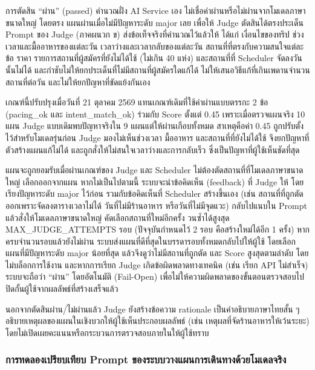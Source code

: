 การตัดสิน ``ผ่าน'' (passed) คำนวณฝั่ง AI Service เอง ไม่เชื่อค่าผ่านหรือไม่ผ่านจากโมเดลภาษาขนาดใหญ่ โดยตรง แผนผ่านเมื่อไม่มีปัญหาระดับ major เลย เพื่อให้ Judge ตัดสินได้ตรงประเด็น Prompt ของ Judge (ภาคผนวก ข) ส่งข้อเท็จจริงที่คำนวณไว้แล้วให้ ได้แก่ เงื่อนไขของทริป ช่วงเวลาและมื้ออาหารของแต่ละวัน เวลาว่างและเวลากลับของแต่ละวัน สถานที่ที่ตรงกับความสนใจแต่ละข้อ ราคา รายการสถานที่ผู้สมัครที่ยังไม่ได้ใช้ (ไม่เกิน 40 แห่ง) และสถานที่ที่ Scheduler จัดลงวันนั้นไม่ได้ และกำชับไม่ให้ยกประเด็นที่ไม่มีสถานที่ผู้สมัครใดแก้ได้ ไม่ให้เสนอวิธีแก้ที่เกินเพดานจำนวนสถานที่ต่อวัน และไม่ให้ยกปัญหาที่ขัดแย้งกันเอง

เกณฑ์นี้ปรับปรุงเมื่อวันที่ 21 ตุลาคม 2569 แทนเกณฑ์เดิมที่ใช้ค่าผ่านแบบตรรกะ 2 ข้อ (pacing\_ok และ intent\_match\_ok) ร่วมกับ Score ตั้งแต่ 0.45 เพราะเมื่อตรวจแผนจริง 10 แผน Judge แบบเดิมพบปัญหาจริงใน 9 แผนแต่ให้ผ่านเกือบทั้งหมด สาเหตุคือค่า 0.45 ถูกปรับตั้งไว้สำหรับโมเดลรุ่นก่อน Judge มองไม่เห็นช่วงเวลา มื้ออาหาร และสถานที่ที่ยังไม่ได้ใช้ จึงยกปัญหาที่ตัวสร้างแผนแก้ไม่ได้ และถูกสั่งให้ไม่สนใจเวลาว่างและการกลับเร็ว ซึ่งเป็นปัญหาที่ผู้ใช้เห็นชัดที่สุด

แผนจะถูกยอมรับเมื่อผ่านเกณฑ์ของ Judge และ Scheduler ไม่ต้องตัดสถานที่ที่โมเดลภาษาขนาดใหญ่ เลือกออกจากแผน หากไม่เป็นไปตามนี้ ระบบจะนำข้อคิดเห็น (feedback) ที่ Judge ให้ โดยเรียงปัญหาระดับ major ไว้ก่อน รวมกับข้อคิดเห็นที่ Scheduler สร้างขึ้นเอง (เช่น สถานที่ที่ถูกตัดออกเพราะจัดลงตารางเวลาไม่ได้ วันที่ไม่มีร้านอาหาร หรือวันที่ไม่มีจุดแวะ) กลับไปแนบใน Prompt แล้วสั่งให้โมเดลภาษาขนาดใหญ่ คัดเลือกสถานที่ใหม่อีกครั้ง วนซ้ำได้สูงสุด MAX\_JUDGE\_ATTEMPTS รอบ (ปัจจุบันกำหนดไว้ 2 รอบ คือสร้างใหม่ได้อีก 1 ครั้ง) หากครบจำนวนรอบแล้วยังไม่ผ่าน ระบบส่งแผนที่ดีที่สุดในบรรดารอบทั้งหมดกลับไปให้ผู้ใช้ โดยเลือกแผนที่มีปัญหาระดับ major น้อยที่สุด แล้วจึงดูว่าไม่มีสถานที่ถูกตัด และ Score สูงสุดตามลำดับ โดยไม่บล็อกการใช้งาน และหากการเรียก Judge เกิดข้อผิดพลาดทางเทคนิค (เช่น เรียก API ไม่สำเร็จ) ระบบจะถือว่า ``ผ่าน'' โดยอัตโนมัติ (Fail-Open) เพื่อไม่ให้ความผิดพลาดของขั้นตอนตรวจสอบไปปิดกั้นผู้ใช้จากผลลัพธ์ที่สร้างเสร็จแล้ว

นอกจากตัดสินผ่าน/ไม่ผ่านแล้ว Judge ยังสร้างข้อความ rationale เป็นคำอธิบายภาษาไทยสั้น ๆ อธิบายเหตุผลของแผนในเชิงบวกให้ผู้ใช้เห็นประกอบผลลัพธ์ (เช่น เหตุผลที่จัดร้านอาหารให้เว้นระยะ) โดยไม่เปิดเผยคะแนนหรือกระบวนการตรวจสอบภายในให้ผู้ใช้ทราบ

\subsubsection{การทดลองเปรียบเทียบ Prompt ของระบบวางแผนการเดินทางด้วยโมเดลจริง}

